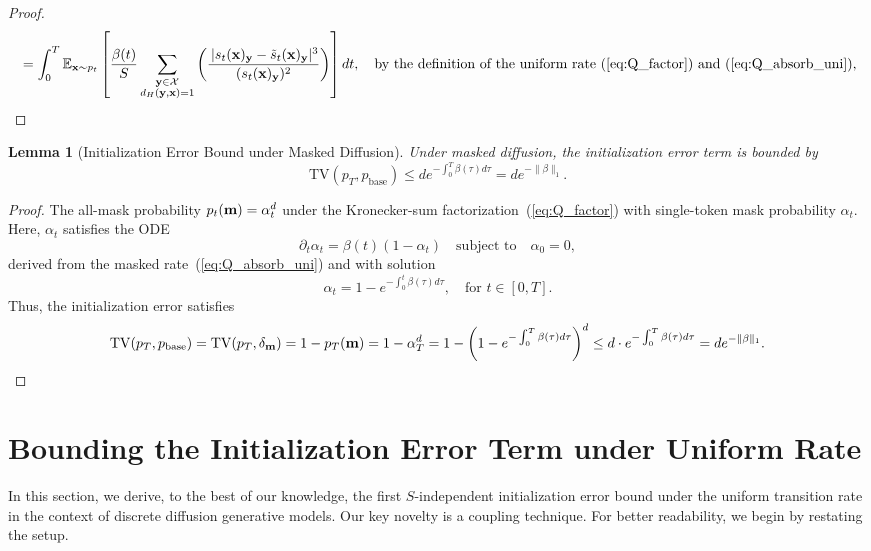 \documentclass{article} %
\newtheorem{lemma}[theorem]{Lemma}
\def\eqref#1{equation~\ref{#1}}
\newcommand{\bfx}{{\bf x}}
\newcommand{\bfy}{ {\bf y}}
\newcommand{\bfm}{{\bf m}}
\newcommand{\TV}{\mathrm{TV}}
\renewcommand{\eqref}[1]{\textup{(\ref{#1})}}
\newcommand{\pbase}{p_\mathrm{base}}
\begin{document}
\begin{proof}
\begin{align*}
        & = \int_0^T \mathbb{E}_{\bfx \sim p_t} \left[ \frac{\beta(t)}{S} \sum_{\substack{\bfy \in\mathcal{X} \\ d_H(\bfy,\bfx)=1}}   \left( \frac{\,|s_t(\bfx)_\bfy - \tilde{s}_t(\bfx)_\bfy|^3}{(s_t(\bfx)_\bfy)^2} \right) \right]  dt, \quad \text{by the definition of the uniform rate~\eqref{eq:Q_factor} and~\eqref{eq:Q_absorb_uni},}  \\
    \end{align*}
\end{proof}

\begin{lemma}[Initialization Error Bound under Masked Diffusion]\label{lemma:prior_mismatch_masked}
    Under masked diffusion, the initialization error term is bounded by
    \begin{equation}
        \TV(p_T, \pbase) \leq d e^{-\int_0^T \beta(\tau) d\tau} = d e^{-\| \beta \|_1}.
    \end{equation}
\end{lemma}

\begin{proof}
The all-mask probability $p_t(\bfm) = \alpha_t^d$ under the Kronecker-sum factorization~\eqref{eq:Q_factor} with single-token
mask probability $\alpha_t$. Here, $\alpha_t$ satisfies the ODE
\begin{equation}
    \partial_t \alpha_t = \beta(t)(1 - \alpha_t) \quad \text{subject to} \quad \alpha_0=0,
\end{equation}
derived from the masked rate~\eqref{eq:Q_absorb_uni} and with solution
\begin{equation}
    \alpha_t = 1-e^{-\int_0^t \beta(\tau) d\tau}, \quad \text{for } t\in[0, T].
\end{equation}
    Thus, the initialization error satisfies
$$
\TV(p_T, p_{\mathrm{base}}) = \TV(p_T, \delta_{\bfm}) = 1 - p_T(\bfm) = 1 - \alpha_T^d = 1 - \left( 1-e^{-\int_0^T \beta(\tau) d\tau} \right)^d \leq d \cdot e^{-\int_0^T \beta(\tau) d\tau}= d e^{-\| \beta \|_1}.
$$
\end{proof}


\section{Bounding the Initialization Error Term under Uniform Rate}\label{sec:coupling_uniform}
In this section, we derive, to the best of our knowledge, the first $S$-independent initialization error bound under the uniform transition rate in the context of discrete diffusion generative models. Our key novelty is a coupling technique. For better readability, we begin by restating the setup.
\end{document}
